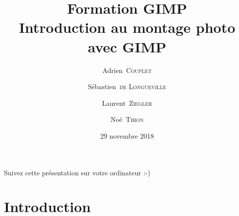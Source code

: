 \documentclass[10pt,svgnames,usenames,table]{beamer}
\institute{Louvain-li-Nux}
\title{\textbf{Formation GIMP}\\
Introduction au montage photo avec GIMP}
\author{Adrien~\textsc{Couplet} \and Sébastien~\textsc{de Longueville} \and Laurent~\textsc{Ziegler} \and Noé~\textsc{Tihon} }
\date{29 novembre 2018}
\begin{document}
\begin{frame}
	\maketitle
\end{frame}

\begin{frame}
  \begin{center}\Large
  Suivez cette présentation sur votre ordinateur :-)
  
  \vspace{1cm}
  \end{center}
\end{frame}

\section{Introduction}
\end{document}
